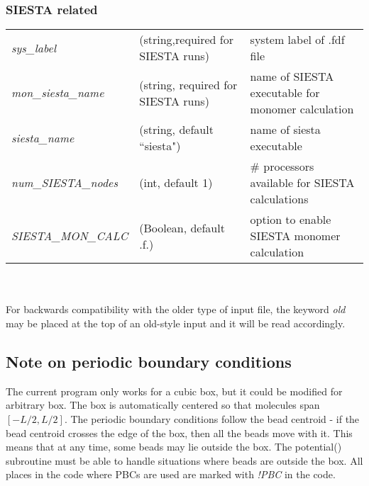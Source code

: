 \documentclass[10pt]{article}
\begin{document}
\subsubsection*{SIESTA related}
\begin{tabular}{l l p{6cm}}
\textit{sys\_label}      &(string,required for SIESTA runs)& system label of .fdf file \\
\textit{mon\_siesta\_name}& (string, required for SIESTA runs) & name of SIESTA executable for monomer calculation \\
\textit{siesta\_name} & (string, default ``siesta") & name of siesta executable \\ 
\textit{num\_SIESTA\_nodes} & (int, default 1)& \# processors available for SIESTA calculations\\ 
\textit{SIESTA\_MON\_CALC} & (Boolean, default .f.) & option to enable SIESTA monomer calculation \\
\end{tabular}
\\ \\
For backwards compatibility with the older type of input file, the keyword \textit{old} may be placed at the top of an old-style input and it will be read accordingly. 

\subsection{Note on periodic boundary conditions}
The current program only works for a cubic box, but it could be modified for arbitrary box. The box is automatically centered so that molecules span $[-L/2, L/2]$. The periodic boundary conditions follow the bead centroid - if the bead centroid crosses the edge of the box, then all the beads move with it. This means that at any time, some beads may lie outside the box. The potential() subroutine must be able to handle situations where beads are outside the box. All places in the code where PBCs are used are marked with \textit{!PBC} in the code. 
\end{document}
